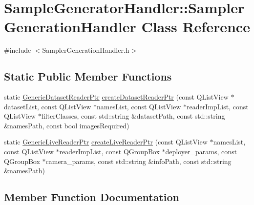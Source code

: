\hypertarget{class_sample_generator_handler_1_1_sampler_generation_handler}{}\section{Sample\+Generator\+Handler\+:\+:Sampler\+Generation\+Handler Class Reference}
\label{class_sample_generator_handler_1_1_sampler_generation_handler}


{\ttfamily \#include $<$Sampler\+Generation\+Handler.\+h$>$}

\subsection*{Static Public Member Functions}
\begin{DoxyCompactItemize}
\item 
static \hyperlink{_generic_dataset_reader_8h_aee69804c49b311360ba65543d4111f58}{Generic\+Dataset\+Reader\+Ptr} \hyperlink{class_sample_generator_handler_1_1_sampler_generation_handler_af7e70df7bcf3189d20278f31c82c4c02}{create\+Dataset\+Reader\+Ptr} (const Q\+List\+View $\ast$dataset\+List, const Q\+List\+View $\ast$names\+List, const Q\+List\+View $\ast$reader\+Imp\+List, const Q\+List\+View $\ast$filter\+Classes, const std\+::string \&dataset\+Path, const std\+::string \&names\+Path, const bool images\+Required)
\item 
static \hyperlink{_generic_live_reader_8h_ad27d78f1cc13a4eb75ca3d14b6188a1a}{Generic\+Live\+Reader\+Ptr} \hyperlink{class_sample_generator_handler_1_1_sampler_generation_handler_ad840c7f9b5a3281f62829933308e7e18}{create\+Live\+Reader\+Ptr} (const Q\+List\+View $\ast$names\+List, const Q\+List\+View $\ast$reader\+Imp\+List, const Q\+Group\+Box $\ast$deployer\+\_\+params, const Q\+Group\+Box $\ast$camera\+\_\+params, const std\+::string \&info\+Path, const std\+::string \&names\+Path)
\end{DoxyCompactItemize}


\subsection{Member Function Documentation}
\mbox{\label{class_sample_generator_handler_1_1_sampler_generation_handler_af7e70df7bcf3189d20278f31c82c4c02}} 
